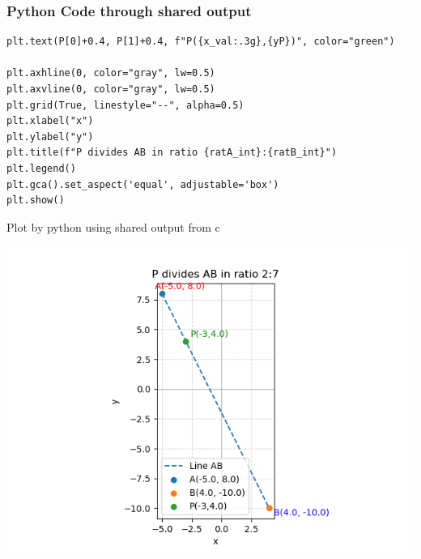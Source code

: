 \documentclass{beamer}
\begin{document}
\begin{frame}[fragile]
	\frametitle{Python Code through shared output}
	\begin{lstlisting}
plt.text(P[0]+0.4, P[1]+0.4, f"P({x_val:.3g},{yP})", color="green")

plt.axhline(0, color="gray", lw=0.5)
plt.axvline(0, color="gray", lw=0.5)
plt.grid(True, linestyle="--", alpha=0.5)
plt.xlabel("x")
plt.ylabel("y")
plt.title(f"P divides AB in ratio {ratA_int}:{ratB_int}")
plt.legend()
plt.gca().set_aspect('equal', adjustable='box')
plt.show()
\end{lstlisting}
\end{frame}
\begin{frame}{Plot by python using shared output from c}
	\begin{center}
		\includegraphics[width=0.6\columnwidth]{figs/Figure.png}
	\end{center}
\end{frame}
\end{document}

